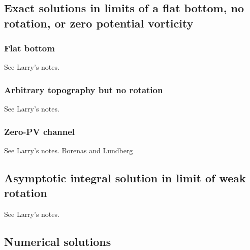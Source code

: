 \documentclass{jfm}
\begin{document}
\subsection{Exact solutions in limits of a flat bottom, no rotation, or zero potential vorticity}

\subsubsection{Flat bottom}

See Larry's notes.

\subsubsection{Arbitrary topography but no rotation}

See Larry's notes.

\subsubsection{Zero-PV channel}

See Larry's notes. Borenas and Lundberg

\subsection{Asymptotic integral solution in limit of weak rotation}

See Larry's notes.

\subsection{Numerical solutions}
\end{document}
